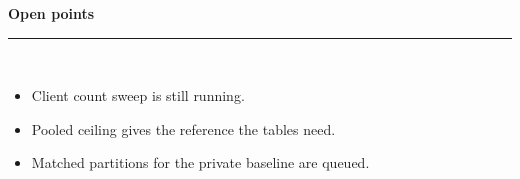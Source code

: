 \documentclass[aspectratio=169,11pt]{beamer}
\newcommand{\redline}{\textcolor{kred}{\rule{\textwidth}{1pt}}}
\begin{document}
\begin{frame}[plain]
  \vfill
  \begin{center}
    {\Large\textbf{\textcolor{kred}{Open points}}}\\[1.2em]
    \redline\\[1em]
    \begin{minipage}{0.8\textwidth}
      \begin{itemize}
        \item Client count sweep is still running.
        \item Pooled ceiling gives the reference the tables need.
        \item Matched partitions for the private baseline are queued.
      \end{itemize}
    \end{minipage}
  \end{center}
  \vfill
\end{frame}
\end{document}
